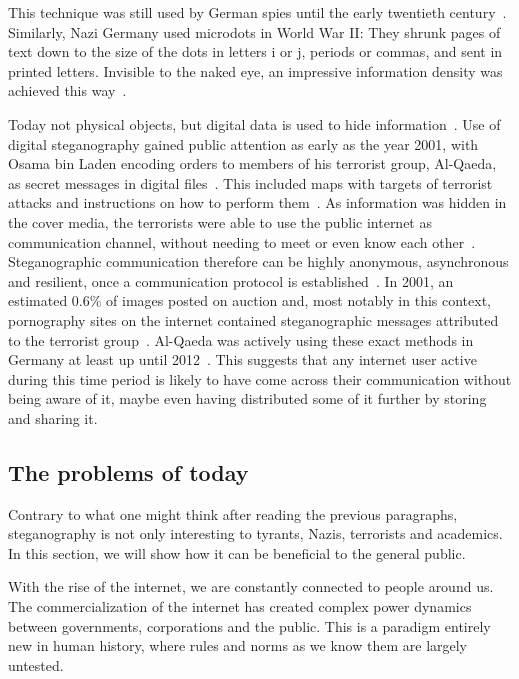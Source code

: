 This technique was still used by German spies until the early twentieth century~\cite{petitcolasInformationHidingSurvey1999}. Similarly, Nazi Germany used microdots in World War II: They shrunk pages of text down to the size of the dots in letters i or j, periods or commas, and sent in printed letters. Invisible to the naked eye, an impressive information density was achieved this way~\cite{dembartEndUserHide2001,petitcolasInformationHidingSurvey1999}.

Today not physical objects, but digital data is used to hide information~\cite{bennettLinguisticSteganographySurvey2004}. Use of digital steganography gained public attention as early as the year 2001, with Osama bin Laden encoding orders to members of his terrorist group, Al-Qaeda, as secret messages in digital files~\cite{dembartEndUserHide2001,schneierTerroristsSteganography2001}. This included maps with targets of terrorist attacks and instructions on how to perform them~\cite{schneierTerroristsSteganography2001}. As information was hidden in the cover media, the terrorists were able to use the public internet as communication channel, without needing to meet or even know each other~\cite{schneierTerroristsSteganography2001}. Steganographic communication therefore can be highly anonymous, asynchronous and resilient, once a communication protocol is established~\cite{schneierTerroristsSteganography2001}. In 2001, an estimated 0.6\% of images posted on auction and, most notably in this context, pornography sites on the internet contained steganographic messages attributed to the terrorist group~\cite{kolataVeiledMessagesTerror2001}. Al-Qaeda was actively using these exact methods in Germany at least up until 2012~\cite{robertsonDocumentsRevealQaedas2012}. This suggests that any internet user active during this time period is likely to have come across their communication without being aware of it, maybe even having distributed some of it further by storing and sharing it.

\subsection{The problems of today}
\label{sec:theProblemsOfToday}
Contrary to what one might think after reading the previous paragraphs, steganography is not only interesting to tyrants, Nazis, terrorists and academics. In this section, we will show how it can be beneficial to the general public.

With the rise of the internet, we are constantly connected to people around us. The commercialization of the internet has created complex power dynamics between governments, corporations and the public. This is a paradigm entirely new in human history, where rules and norms as we know them are largely untested.

